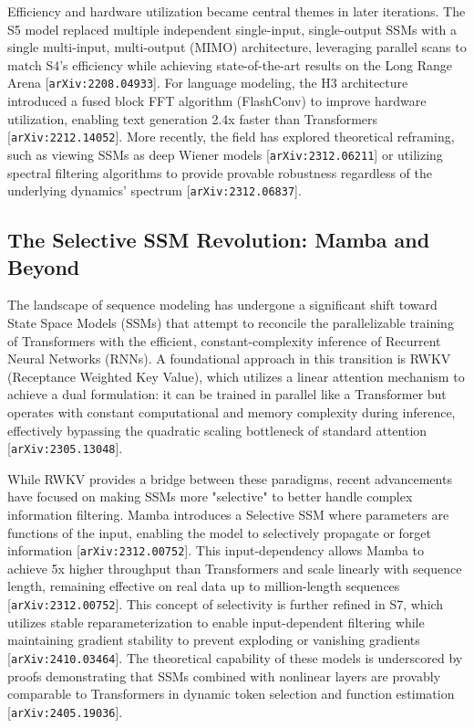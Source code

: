 \documentclass[11pt]{article}
\begin{document}
Efficiency and hardware utilization became central themes in later iterations. The S5 model replaced multiple independent single-input, single-output SSMs with a single multi-input, multi-output (MIMO) architecture, leveraging parallel scans to match S4's efficiency while achieving state-of-the-art results on the Long Range Arena [\texttt{arXiv:2208.04933}]. For language modeling, the H3 architecture introduced a fused block FFT algorithm (FlashConv) to improve hardware utilization, enabling text generation 2.4x faster than Transformers [\texttt{arXiv:2212.14052}]. More recently, the field has explored theoretical reframing, such as viewing SSMs as deep Wiener models [\texttt{arXiv:2312.06211}] or utilizing spectral filtering algorithms to provide provable robustness regardless of the underlying dynamics' spectrum [\texttt{arXiv:2312.06837}].

\subsection{The Selective SSM Revolution: Mamba and Beyond}

The landscape of sequence modeling has undergone a significant shift toward State Space Models (SSMs) that attempt to reconcile the parallelizable training of Transformers with the efficient, constant-complexity inference of Recurrent Neural Networks (RNNs). A foundational approach in this transition is RWKV (Receptance Weighted Key Value), which utilizes a linear attention mechanism to achieve a dual formulation: it can be trained in parallel like a Transformer but operates with constant computational and memory complexity during inference, effectively bypassing the quadratic scaling bottleneck of standard attention [\texttt{arXiv:2305.13048}].

While RWKV provides a bridge between these paradigms, recent advancements have focused on making SSMs more "selective" to better handle complex information filtering. Mamba introduces a Selective SSM where parameters are functions of the input, enabling the model to selectively propagate or forget information [\texttt{arXiv:2312.00752}]. This input-dependency allows Mamba to achieve 5x higher throughput than Transformers and scale linearly with sequence length, remaining effective on real data up to million-length sequences [\texttt{arXiv:2312.00752}]. This concept of selectivity is further refined in S7, which utilizes stable reparameterization to enable input-dependent filtering while maintaining gradient stability to prevent exploding or vanishing gradients [\texttt{arXiv:2410.03464}]. The theoretical capability of these models is underscored by proofs demonstrating that SSMs combined with nonlinear layers are provably comparable to Transformers in dynamic token selection and function estimation [\texttt{arXiv:2405.19036}].
\end{document}
